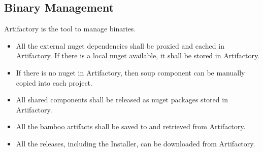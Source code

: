 \subsection{Binary Management}
Artifactory is the tool to manage binaries.
\begin{itemize}
    \item All the external nuget dependencies shall be proxied and cached in
      Artifactory. If there is a local nuget available, it shall be stored in
      Artifactory.
    \item If there is no nuget in Artifactory, then \gls{soup} component can be
    manually copied into each project.
    \item All shared components shall be released as nuget packages
      stored in Artifactory.
    \item All the \gls{bamboo} artifacts shall be saved to and retrieved from
      Artifactory.
    \item All the releases, including the Installer, can be downloaded from
      Artifactory.
  \end{itemize}
